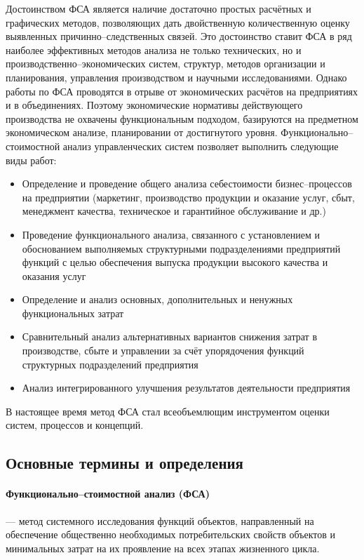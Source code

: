Достоинством ФСА является наличие достаточно простых расчётных и графических
методов, позволяющих дать двойственную количественную оценку выявленных
причинно--следственных связей. Это достоинство ставит ФСА в ряд наиболее
эффективных методов анализа не только технических, но и
производственно--экономических систем, структур, методов организации и
планирования, управления производством и научными исследованиями. Однако работы
по ФСА проводятся в отрыве от экономических расчётов на предприятиях и в
объединениях.
Поэтому экономические нормативы действующего производства не охвачены
функциональным подходом, базируются на предметном экономическом анализе,
планировании от достигнутого уровня.
Функционально--стоимостной анализ управленческих систем позволяет выполнить
следующие виды работ:
\begin{itemize}
    \item Определение и проведение общего анализа себестоимости
    бизнес--процессов на предприятии (маркетинг, производство продукции и
    оказание услуг, сбыт, менеджмент качества, техническое и гарантийное
    обслуживание и др.)
    \item Проведение функционального анализа, связанного с установлением и
    обоснованием выполняемых структурными подразделениями предприятий функций с
    целью обеспечения выпуска продукции высокого качества и оказания услуг
    \item Определение и анализ основных, дополнительных и ненужных
    функциональных затрат
    \item Сравнительный анализ альтернативных вариантов снижения затрат в
    производстве, сбыте и управлении за счёт упорядочения функций структурных
    подразделений предприятия
    \item Анализ интегрированного улучшения результатов деятельности
предприятия
\end{itemize}

В настоящее время метод ФСА стал всеобъемлющим инструментом
оценки систем, процессов и концепций.

\subsection{Основные термины и определения}

\paragraph{Функционально--стоимостной анализ (ФСА)} --- метод системного
исследования функций объектов, направленный на обеспечение общественно
необходимых потребительских свойств объектов и минимальных затрат на их
проявление на всех этапах жизненного цикла.

